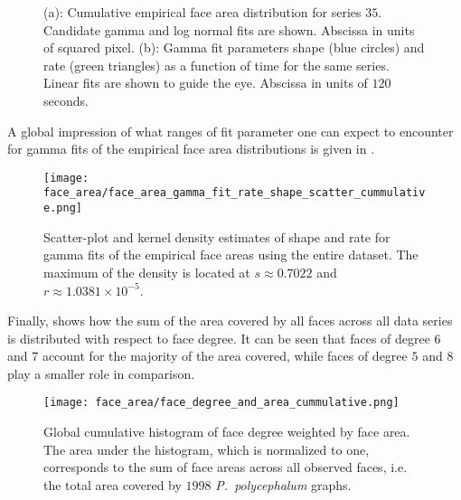 		\begin{figure}
			\centering

			\caption[Face area distribution]{(a): Cumulative empirical face area distribution for series $35$. Candidate gamma and log normal fits are shown. Abscissa in units of squared pixel. (b): Gamma fit parameters shape (blue circles) and rate (green triangles) as a function of time for the same series. Linear fits are shown to guide the eye. Abscissa in units of $120$ seconds.}
			\label{fig:face_area_fit}
		\end{figure}


		A global impression of what ranges of fit parameter one can expect to encounter for gamma fits of the empirical face area distributions is given in . 

		\begin{figure}[!htbp]
			\centering
				\texttt{[image: face\_area/face\_area\_gamma\_fit\_rate\_shape\_scatter\_cummulative.png]}
			\caption[Face area distribution fit parameter densities.]{Scatter-plot and kernel density estimates of shape and rate for gamma fits of the empirical face areas using the entire dataset. The maximum of the density is located at $s \approx 0.7022$ and $r \approx 1.0381 \times 10^{-5}$.}
			\label{fig:face_area_kde}
		\end{figure}

		Finally,  shows how the sum of the area covered by all faces across all data series is distributed with respect to face degree. It can be seen that faces of degree $6$ and $7$ account for the majority of the area covered, while faces of degree $5$ and $8$ play a smaller role in comparison. 

		\begin{figure}[!htbp]
			\centering
				\texttt{[image: face\_area/face\_degree\_and\_area\_cummulative.png]}
			\caption[Face degree weighted by face area.]{Global cumulative histogram of face degree weighted by face area. The area under the histogram, which is normalized to one, corresponds to the sum of face areas across all observed faces, i.e. the total area covered by $1998$ \emph{P.~polycephalum} graphs.}
			\label{fig:face_degree_per_area}
		\end{figure}

